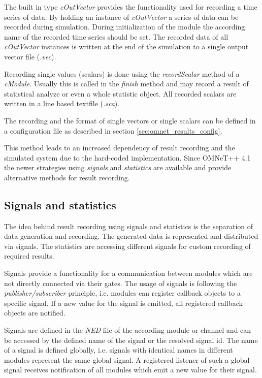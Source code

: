 The built in type \emph{cOutVector} provides the functionality used for recording a time series of data.
By holding an instance of \emph{cOutVector} a series of data can be recorded during simulation.
During initialization of the module the according name of the recorded time series should be set.
The recorded data of all \emph{cOutVector} instances is written at the end of the simulation to a single output vector file (\emph{.vec}). \cite[section 7.9.1]{omnet_manual}

Recording single values (scalars) is done using the \emph{recordScalar} method of a \emph{cModule}.
Usually this is called in the \emph{finish} method and may record a result of statistical analyze or even a whole statistic object.
All recorded scalars are written in a line based textfile (\emph{.sca}). \cite[section 7.9.2]{omnet_manual}

The recording and the format of single vectors or single scalars can be defined in a configuration file as described in section \ref{sec:omnet_results_config}.

This method leads to an increased dependency of result recording and the simulated system due to the hard-coded implementation.
Since OMNeT++ 4.1 the newer strategies using \emph{signals} and \emph{statistics} are available and provide alternative methods for result recording.

\subsection{Signals and statistics}
\label{sec:omnet_results_signals}
The idea behind result recording using signals and statistics is the separation of data generation and recording.
The generated data is represented and distributed via signals.
The statistics are accessing different signals for custom recording of required results. \cite[section 12.1.1]{omnet_manual}

Signals provide a functionality for a communication between modules which are not directly connected via their gates.
The usage of signals is following the \emph{publisher/subscriber} principle, i.e. modules can register callback objects to a specific signal.
If a new value for the signal is emitted, all registered callback objects are notified.

Signals are defined in the \emph{NED} file of the according module or channel and can be accessed by the defined name of the signal or the resolved signal id.
The name of a signal is defined globally, i.e. signals with identical names in different modules represent the same global signal.
A registered listener of such a global signal receives notification of all modules which emit a new value for their signal. \cite[section 4.14]{omnet_manual}

